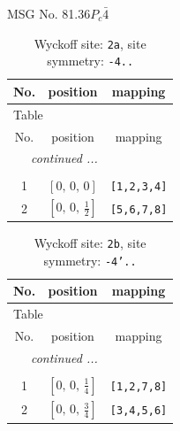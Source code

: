 \documentclass[fleqn,8pt]{jsarticle}
\begin{document}
\setcounter{MaxMatrixCols}{32}

\renewcommand{\tablename}{Table~}
\renewcommand{\figurename}{Figure~}
\begin{center}
\LARGE
MSG No. 81.36\quad$P_{c}\bar{4}$
\end{center}
\renewcommand{\arraystretch}{1.2}
\begin{longtable}{ccc}
\caption{Wyckoff site: {\tt 2a}, site symmetry: {\tt -4..}}
 \\
 \hline \hline
No. & position & mapping \\ \hline \endfirsthead

\multicolumn{2}{l}{\tablename\ \thetable{}} \\
 \hline \hline
No. & position & mapping \\ \hline \endhead

 \hline \hline
\multicolumn{2}{r}{\footnotesize\it continued ...} \\ \endfoot

 \hline \hline
\multicolumn{2}{r}{} \\ \endlastfoot

1 & $\left[ 0,\, 0,\, 0 \right]$ & {\tt [1,2,3,4]} \\ \hline
2 & $\left[ 0,\, 0,\, \frac{1}{2} \right]$ & {\tt [5,6,7,8]} \\
\end{longtable}
\renewcommand{\arraystretch}{1.2}
\begin{longtable}{ccc}
\caption{Wyckoff site: {\tt 2b}, site symmetry: {\tt -4'..}}
 \\
 \hline \hline
No. & position & mapping \\ \hline \endfirsthead

\multicolumn{2}{l}{\tablename\ \thetable{}} \\
 \hline \hline
No. & position & mapping \\ \hline \endhead

 \hline \hline
\multicolumn{2}{r}{\footnotesize\it continued ...} \\ \endfoot

 \hline \hline
\multicolumn{2}{r}{} \\ \endlastfoot

1 & $\left[ 0,\, 0,\, \frac{1}{4} \right]$ & {\tt [1,2,7,8]} \\ \hline
2 & $\left[ 0,\, 0,\, \frac{3}{4} \right]$ & {\tt [3,4,5,6]} \\
\end{longtable}
\renewcommand{\arraystretch}{1.2}
\end{document}
